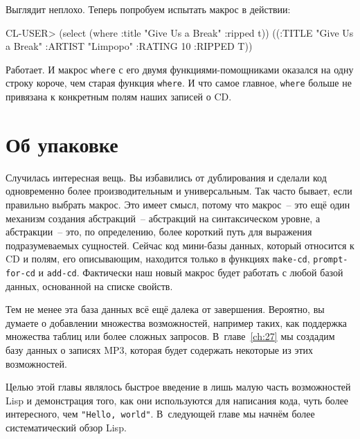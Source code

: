 Выглядит неплохо. Теперь попробуем испытать макрос в действии:

\begin{myverb}
CL-USER> (select (where :title "Give Us a Break" :ripped t))
((:TITLE "Give Us a Break" :ARTIST "Limpopo" :RATING 10 :RIPPED T))
\end{myverb}

Работает. И макрос \lstinline{where} с его двумя функциями-помощниками оказался на одну строку
короче, чем старая функция \lstinline{where}. И что самое главное, \lstinline{where} больше не
привязана к конкретным полям наших записей о CD.

\section{Об упаковке}

Случилась интересная вещь. Вы избавились от дублирования и сделали код одновременно более
производительным и универсальным. Так часто бывает, если правильно выбрать макрос. Это
имеет смысл, потому что макрос~-- это ещё один механизм создания абстракций~--
абстракций на синтаксическом уровне, а абстракции~-- это, по определению, более короткий
путь для выражения подразумеваемых сущностей. Сейчас код мини-базы данных, который
относится к CD и полям, его описывающим, находится только в функциях \lstinline{make-cd},
\lstinline{prompt-for-cd} и \lstinline{add-cd}. Фактически наш новый макрос будет работать с любой
базой данных, основанной на списке свойств.

Тем не менее эта база данных всё ещё далека от завершения. Вероятно, вы думаете о
добавлении множества возможностей, например таких, как поддержка множества таблиц или
более сложных запросов. В~главе~\ref{ch:27} мы создадим базу данных о записях MP3, которая будет
содержать некоторые из этих возможностей.

Целью этой главы являлось быстрое введение в лишь малую часть возможностей Lisp и
демонстрация того, как они используются для написания кода, чуть более интересного, чем
\lstinline{"Hello, world"}. В~следующей главе мы начнём более систематический обзор Lisp.

